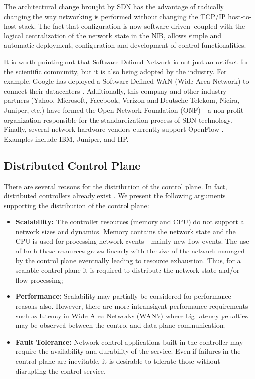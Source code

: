The architectural change brought by SDN has the  advantage of
radically changing  the way networking is performed  without changing
the TCP/IP host-to-host stack. The fact that configuration is now
software driven, coupled with the logical centralization of the
network state in the NIB, allows simple and automatic deployment,
configuration and development of  control functionalities. 

 It is worth pointing out that Software Defined Network is not just an
 artifact for the scientific community, but it is also being adopted
 by the industry. For example, Google has deployed a Software Defined
 WAN (Wide Area Network) to connect their datacenters
 \cite{Hoezle:2012uq}. Additionally, this company and other industry
 partners (Yahoo, Microsoft, Facebook, Verizon and Deutsche Telekom,
 Nicira, Juniper, etc.) have formed the Open Network Foundation (ONF)
 \cite{onf} - a non-profit organization  responsible for the
 standardization process of SDN technology. Finally, several network
 hardware vendors currently support OpenFlow \cite{openflow}. Examples
 include IBM, Juniper, and HP. 

\subsection{Distributed Control Plane}
There are several reasons for the distribution of the control plane. In fact, distributed controllers already exist \distcontrollers. We present the following arguments supporting the distribution of the control plane: 

\begin{itemize}
\item[] \textbf{Scalability:}  The controller resources (memory and CPU) do not support all network sizes and dynamics.  Memory contains the network state and the CPU is used for processing network events - mainly new flow events. The use of both these resources grows linearly with the size of the network managed by the control plane eventually leading to  resource exhaustion. Thus, for a scalable control plane it is required to distribute the network state and/or flow processing; 
\item[] \textbf{Performance:}  Scalability may partially be considered for performance reasons also. However, there are more intransigent performance requirements such as latency in Wide Area Networks (WAN's) where big latency penalties may be observed between the  control and data plane  communication; 
\item[] \textbf{Fault Tolerance:} Network control applications built in the controller  may require the availability and durability of the service. Even if failures in the control plane are inevitable, it is desirable to tolerate those without disrupting the  control service. 
\end{itemize}

